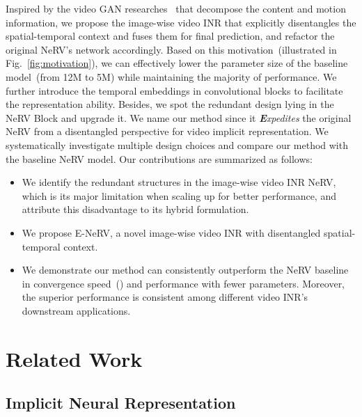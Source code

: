 \documentclass[runningheads]{llncs}
\begin{document}
Inspired by the video GAN researches~\cite{villegas2017decomposing,hsieh2018learning,yu2021generating} that decompose the content and motion information, we propose the image-wise video INR that explicitly disentangles the spatial-temporal context and fuses them for final prediction, and refactor the original NeRV's network accordingly. Based on this motivation~(illustrated in Fig.~\ref{fig:motivation}), we can effectively lower the parameter size of the baseline model~(from 12M to 5M) while maintaining the majority of performance. We further introduce the temporal embeddings in convolutional blocks to facilitate the representation ability. Besides, we spot the redundant design lying in the NeRV Block and upgrade it. 
We name our method \netname since it \textit{\textbf{E}xpedites} the original NeRV from a disentangled perspective for video implicit representation. We systematically investigate multiple design choices and compare our method with the baseline NeRV model. Our contributions are summarized as follows:
\begin{itemize}
    \item We identify the redundant structures in the image-wise video INR NeRV, which is its major limitation when scaling up for better performance, and attribute this disadvantage to its hybrid formulation.
    \item We propose E-NeRV, a novel image-wise video INR with disentangled spatial-temporal context. 
    \item We demonstrate our method can consistently outperform the NeRV baseline in convergence speed~() and performance with fewer parameters. Moreover, the superior performance is consistent among different video INR's downstream applications.
\end{itemize}
 \section{Related Work}
\label{related}

\subsection{Implicit Neural Representation}
\end{document}
